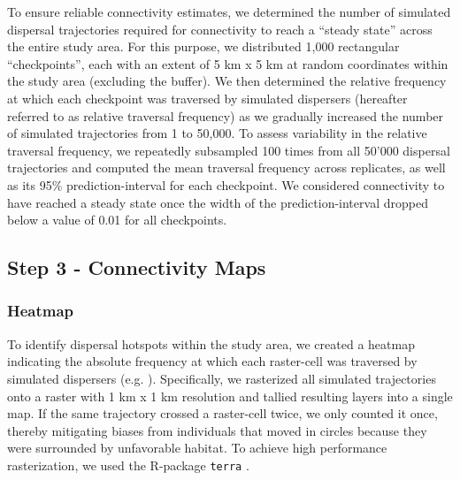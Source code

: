 \documentclass[abstract=on,10pt,a4paper,bibliography=totocnumbered]{article}
\begin{document}
To ensure reliable connectivity estimates, we determined the number of simulated
dispersal trajectories required for connectivity to reach a ``steady state''
across the entire study area. For this purpose, we distributed 1,000 rectangular
``checkpoints'', each with an extent of 5 km x 5 km at random coordinates within
the study area (excluding the buffer). We then determined the relative frequency
at which each checkpoint was traversed by simulated dispersers (hereafter
referred to as relative traversal frequency) as we gradually increased the
number of simulated trajectories from 1 to 50,000. To assess variability in the
relative traversal frequency, we repeatedly subsampled 100 times from all 50'000
dispersal trajectories and computed the mean traversal frequency across
replicates, as well as its 95\% prediction-interval for each checkpoint. We
considered connectivity to have reached a steady state once the width of the
prediction-interval dropped below a value of 0.01 for all checkpoints.

\subsection{Step 3 - Connectivity Maps}
\subsubsection{Heatmap}
To identify dispersal hotspots within the study area, we created a heatmap
indicating the absolute frequency at which each raster-cell was traversed by
simulated dispersers (e.g. \citealp{Peer.2008, Hauenstein.2019, Zeller.2020}).
Specifically, we rasterized all simulated trajectories onto a raster with 1 km x
1 km resolution and tallied resulting layers into a single map. If the same
trajectory crossed a raster-cell twice, we only counted it once, thereby
mitigating biases from individuals that moved in circles because they were
surrounded by unfavorable habitat. To achieve high performance rasterization, we
used the R-package {\tt terra} \citep{Hijmans.2021b}.
\end{document}
